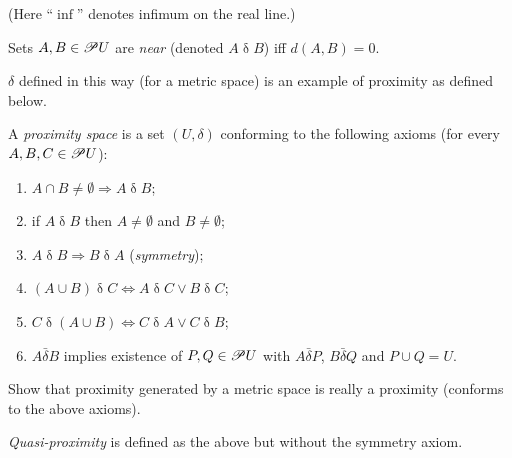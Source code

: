 (Here ``$\inf$'' denotes infimum on the real line.)
\begin{defn}
Sets $A,B\in\mathscr{P} U$ are \emph{near} (denoted $A\mathrel\delta B$)
iff $d(A,B)=0$.
\end{defn}
$\delta$ defined in this way (for a metric space) is an example of
proximity as defined below.
\begin{defn}
\label{prox}A \emph{proximity
space} is a set $(U,\delta)$ conforming to the following axioms (for
every $A,B,C\in\mathscr{P} U$):
\begin{enumerate}
\item $A\cap B\ne\emptyset\Rightarrow A\mathrel\delta B$;
\item if $A\mathrel\delta B$ then $A\ne\emptyset$ and $B\ne\emptyset$;
\item $A\mathrel\delta B\Rightarrow B\mathrel\delta A$ (\emph{symmetry});
\item $(A\cup B)\mathrel\delta C\Leftrightarrow A\mathrel\delta C\lor B\mathrel\delta C$;
\item $C\mathrel\delta(A\cup B)\Leftrightarrow C\mathrel\delta A\lor C\mathrel\delta B$;
\item \label{prox-last}$A\mathrel{\bar{\delta}}B$ implies existence of
$P,Q\in\mathscr{P} U$ with $A\mathrel{\bar{\delta}}P$, $B\mathrel{\bar{\delta}}Q$
and $P\cup Q=U$.
\end{enumerate}
\end{defn}
\begin{xca}
Show that proximity generated by a metric space is really a proximity
(conforms to the above axioms).\end{xca}
\begin{defn}
\emph{Quasi-proximity} is defined as the above
but without the symmetry axiom.
\end{defn}

